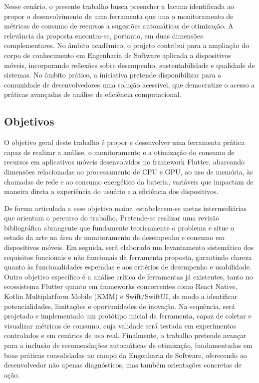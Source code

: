 \documentclass[12pt,a4paper]{article}
\begin{document}
Nesse cenário, o presente trabalho busca preencher a lacuna identificada ao propor o desenvolvimento de uma ferramenta que una o monitoramento de métricas de consumo de recursos a sugestões automáticas de otimização. A relevância da proposta encontra-se, portanto, em duas dimensões complementares. No âmbito acadêmico, o projeto contribui para a ampliação do corpo de conhecimento em Engenharia de Software aplicada a dispositivos móveis, incorporando reflexões sobre desempenho, sustentabilidade e qualidade de sistemas. No âmbito prático, a iniciativa pretende disponibilizar para a comunidade de desenvolvedores uma solução acessível, que democratize o acesso a práticas avançadas de análise de eficiência computacional.

\subsection{Objetivos}
O objetivo geral deste trabalho é propor e desenvolver uma ferramenta prática capaz de realizar a análise, o monitoramento e a otimização do consumo de recursos em aplicativos móveis desenvolvidos no framework Flutter, abarcando dimensões relacionadas ao processamento de CPU e GPU, ao uso de memória, às chamadas de rede e ao consumo energético da bateria, variáveis que impactam de maneira direta a experiência do usuário e a eficiência dos dispositivos.  

De forma articulada a esse objetivo maior, estabelecem-se metas intermediárias que orientam o percurso do trabalho. Pretende-se realizar uma revisão bibliográfica abrangente que fundamente teoricamente o problema e situe o estado da arte na área de monitoramento de desempenho e consumo em dispositivos móveis. Em seguida, será elaborado um levantamento sistemático dos requisitos funcionais e não funcionais da ferramenta proposta, garantindo clareza quanto às funcionalidades esperadas e aos critérios de desempenho e usabilidade. Outro objetivo específico é a análise crítica de ferramentas já existentes, tanto no ecossistema Flutter quanto em frameworks concorrentes como React Native, Kotlin Multiplatform Mobile (KMM) e Swift/SwiftUI, de modo a identificar potencialidades, limitações e oportunidades de inovação. Na sequência, será projetado e implementado um protótipo inicial da ferramenta, capaz de coletar e visualizar métricas de consumo, cuja validade será testada em experimentos controlados e em cenários de uso real. Finalmente, o trabalho pretende avançar para a inclusão de recomendações automáticas de otimização, fundamentadas em boas práticas consolidadas no campo da Engenharia de Software, oferecendo ao desenvolvedor não apenas diagnósticos, mas também orientações concretas de ação.
\end{document}
